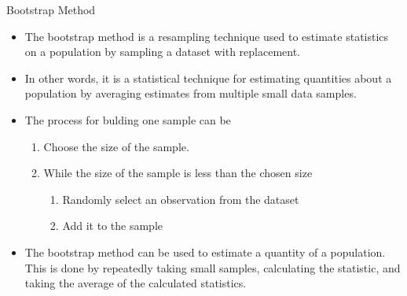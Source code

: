 \documentclass{beamer}
\begin{document}
\begin{frame}{Bootstrap Method}
	\begin{itemize}
		\item The bootstrap method is a resampling technique used to estimate statistics on a population by sampling a dataset with replacement.
		\item In other words, it is a statistical technique for estimating quantities about a population by averaging estimates from multiple small data samples.
		\item The process for bulding one sample can be
		\begin{enumerate}
			\item Choose the size of the sample.
			\item While the size of the sample is less than the chosen size
			\begin{enumerate}	
				\item Randomly select an observation from the dataset
				\item Add it to the sample
			\end{enumerate} 
		\end{enumerate}
		\item The bootstrap method can be used to estimate a quantity of a population. This is done by repeatedly taking small samples, calculating the statistic, and taking the average of the calculated statistics.
	\end{itemize}
\end{frame}
\end{document}
